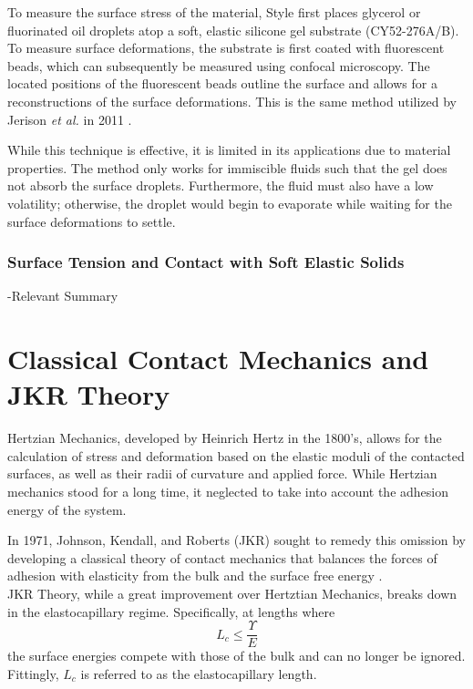 To measure the surface stress of the material, Style first places glycerol or fluorinated oil droplets atop a soft, elastic silicone gel substrate (CY52-276A/B). To measure surface deformations, the substrate is first coated with fluorescent beads, which can subsequently be measured using confocal microscopy. The located positions of the fluorescent beads outline the surface and allows for a reconstructions of the surface deformations. This is the same method utilized by Jerison \emph{et al.} in 2011  \cite{jerison2011deformation}.

While this technique is effective, it is limited in its applications due to material properties. The method only works for immiscible fluids such that the gel does not absorb the surface droplets. Furthermore, the fluid must also have a low volatility; otherwise, the droplet would begin to evaporate while waiting for the surface deformations to settle.

\subsubsection{Surface Tension and Contact with Soft Elastic Solids}
-Relevant Summary

\section{Classical Contact Mechanics and JKR Theory}

Hertzian Mechanics, developed by Heinrich Hertz in the 1800's, allows for the calculation of stress and deformation based on the elastic moduli of the contacted surfaces, as well as their radii of curvature and applied force. While Hertzian mechanics stood for a long time, it neglected to take into account the adhesion energy of the system.  

In 1971, Johnson, Kendall, and Roberts (JKR) sought to remedy this omission by developing a classical theory of contact mechanics that balances the forces of adhesion with elasticity from the bulk and the surface free energy \cite{johnson1971surface}. \\ 

JKR Theory, while a great improvement over Hertztian Mechanics, breaks down in the elastocapillary regime. Specifically, at lengths where 
\begin{equation}
	\label{EC_regime}
	L_{c} \leq \frac{\Upsilon}{E}
\end{equation}
the surface energies compete with those of the bulk and can no longer be ignored. Fittingly, $L_c$ is referred to as the elastocapillary length. 

